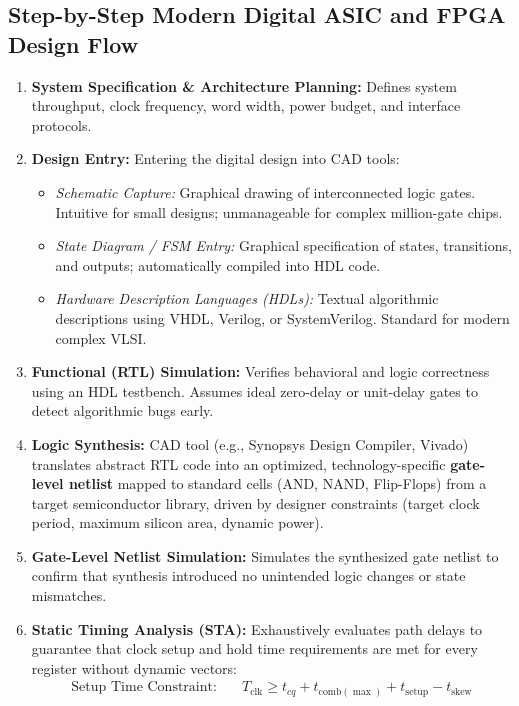 \documentclass[12pt,a4paper]{article}
\begin{document}
\subsection{Step-by-Step Modern Digital ASIC and FPGA Design Flow}
\begin{enumerate}[label=\arabic*., leftmargin=*]
  \item \textbf{System Specification \& Architecture Planning:} Defines system throughput, clock frequency, word width, power budget, and interface protocols.
  \item \textbf{Design Entry:} Entering the digital design into CAD tools:
    \begin{itemize}
      \item \textit{Schematic Capture:} Graphical drawing of interconnected logic gates. Intuitive for small designs; unmanageable for complex million-gate chips.
      \item \textit{State Diagram / FSM Entry:} Graphical specification of states, transitions, and outputs; automatically compiled into HDL code.
      \item \textit{Hardware Description Languages (HDLs):} Textual algorithmic descriptions using VHDL, Verilog, or SystemVerilog. Standard for modern complex VLSI.
    \end{itemize}
  \item \textbf{Functional (RTL) Simulation:} Verifies behavioral and logic correctness using an HDL testbench. Assumes ideal zero-delay or unit-delay gates to detect algorithmic bugs early.
  \item \textbf{Logic Synthesis:} CAD tool (e.g., Synopsys Design Compiler, Vivado) translates abstract RTL code into an optimized, technology-specific \textbf{gate-level netlist} mapped to standard cells (AND, NAND, Flip-Flops) from a target semiconductor library, driven by designer constraints (target clock period, maximum silicon area, dynamic power).
  \item \textbf{Gate-Level Netlist Simulation:} Simulates the synthesized gate netlist to confirm that synthesis introduced no unintended logic changes or state mismatches.
  \item \textbf{Static Timing Analysis (STA):} Exhaustively evaluates path delays to guarantee that clock setup and hold time requirements are met for every register without dynamic vectors:
    \begin{align}
      \text{Setup Time Constraint:} \quad & T_{\text{clk}} \ge t_{cq} + t_{\text{comb}(\max)} + t_{\text{setup}} - t_{\text{skew}} \\

\end{align}
\end{enumerate}
\end{document}
